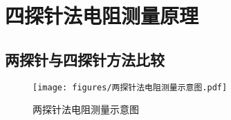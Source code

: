 \documentclass[12pt]{ctexart}
\begin{document}

\newpage

\section{四探针法电阻测量原理}

\subsection{两探针与四探针方法比较}

\begin{figure}[H]
	\centering
	\texttt{[image: figures/两探针法电阻测量示意图.pdf]}
	\caption{两探针法电阻测量示意图\label{figure:two point illustration}}
\end{figure}
\end{document}
